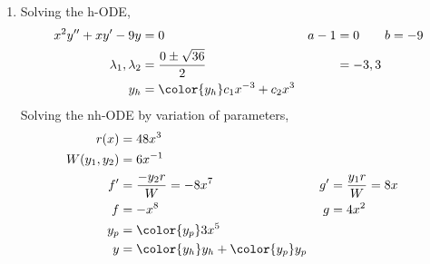 \begin{enumerate}
    \item Solving the h-ODE,
          \begin{align}
              x^{2}y'' + xy' - 9y      & = 0                                      & a - 1 & = 0 \qquad b = -9 \\
              \lambda_{1}, \lambda_{2} & = \frac{0 \pm \sqrt{36}}{2}              &       & = -3, 3           \\
              y_{h}                    & = {\color{y_h} c_{1}x^{-3} + c_{2}x^{3}}
          \end{align}
          Solving the nh-ODE by variation of parameters,
          \begin{align}
              r(x)            & = 48x^{3}                                                                  \\
              W(y_{1}, y_{2}) & = 6x^{-1}                                                                  \\
              f'              & = \frac{-y_{2}r}{W} = -8x^{7}               & g' & = \frac{y_{1}r}{W} = 8x \\
              f               & = -x^{8}                                    & g  & = 4x^{2}                \\
              y_{p}           & = {\color{y_p} 3x^{5}}                                                     \\
              y               & = {\color{y_h} y_{h}} + {\color{y_p} y_{p}}
          \end{align}


\end{enumerate}
